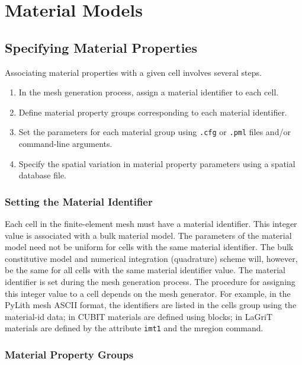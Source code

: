 
\chapter{\label{cha:material:models}Material Models}

\raggedbottom


\section{Specifying Material Properties}

Associating material properties with a given cell involves several
steps. 
\begin{enumerate}
\item In the mesh generation process, assign a material identifier to each
cell.
\item Define material property groups corresponding to each material identifier.
\item Set the parameters for each material group using \texttt{.cfg} or
\texttt{.pml} files and/or command-line arguments.
\item Specify the spatial variation in material property parameters using
a spatial database file.
\end{enumerate}

\subsection{Setting the Material Identifier}

Each cell in the finite-element mesh must have a material identifier.
This integer value is associated with a bulk material model. The parameters
of the material model need not be uniform for cells with the same
material identifier. The bulk constitutive model and numerical integration
(quadrature) scheme will, however, be the same for all cells with
the same material identifier value. The material identifier is set
during the mesh generation process. The procedure for assigning this
integer value to a cell depends on the mesh generator. For example,
in the PyLith mesh ASCII format, the identifiers are listed in the
cells group using the material-id data; in CUBIT materials are defined
using blocks; in LaGriT materials are defined by the attribute \texttt{imt1}
and the mregion command.


\subsection{Material Property Groups}

